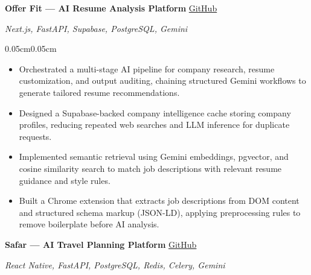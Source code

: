 \documentclass[10pt, letterpaper]{article}
\newenvironment{highlights}{
\begin{itemize}[
    topsep=0.03cm,
    itemsep=0.8pt,
    parsep=0pt,
    partopsep=0pt,
    leftmargin=0.38cm
]
}{
\end{itemize}
}
\newenvironment{onecolentry}{
\begin{adjustwidth}{0.05cm}{0.05cm}
}{
\end{adjustwidth}
}
\let\hrefWithoutArrow\href
\renewcommand{\href}[2]{\hrefWithoutArrow{#1}{#2}}
\begin{document}

\textbf{Offer Fit --- AI Resume Analysis Platform}
\hfill
\href{https://github.com/shekar2280/Offer-Fit}{GitHub}

\textit{Next.js, FastAPI, Supabase, PostgreSQL, Gemini}

\begin{onecolentry}
\begin{highlights}

\item Orchestrated a multi-stage AI pipeline for company research, resume customization, and output auditing, chaining structured Gemini workflows to generate tailored resume recommendations.

\item Designed a Supabase-backed company intelligence cache storing company profiles, reducing repeated web searches and LLM inference for duplicate requests.

\item Implemented semantic retrieval using Gemini embeddings, pgvector, and cosine similarity search to match job descriptions with relevant resume guidance and style rules.

\item Built a Chrome extension that extracts job descriptions from DOM content and structured schema markup (JSON-LD), applying preprocessing rules to remove boilerplate before AI analysis.

\end{highlights}
\end{onecolentry}

\vspace{0.15cm}



\textbf{Safar --- AI Travel Planning Platform}
\hfill
\href{https://github.com/shekar2280/safar-app}{GitHub}

\textit{React Native, FastAPI, PostgreSQL, Redis, Celery, Gemini}
\end{document}
